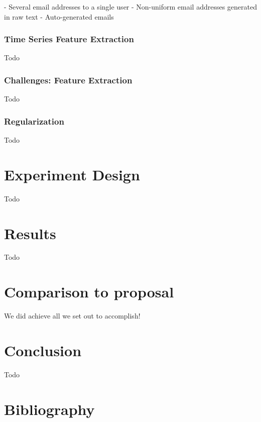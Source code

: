 \documentclass[11pt,letterpaper]{article}
\begin{document}
- Several email addresses to a single user
- Non-uniform email addresses generated in raw text
- Auto-generated emails


\subsubsection{Time Series Feature Extraction}
Todo
\subsubsection{Challenges: Feature Extraction}
Todo
\subsubsection{Regularization}
Todo

\section{Experiment Design}
Todo
\section{Results}
Todo

\section{Comparison to proposal}
We did achieve all we set out to accomplish!

\section{Conclusion}
Todo



\section*{Bibliography}


%
%
\end{document}
